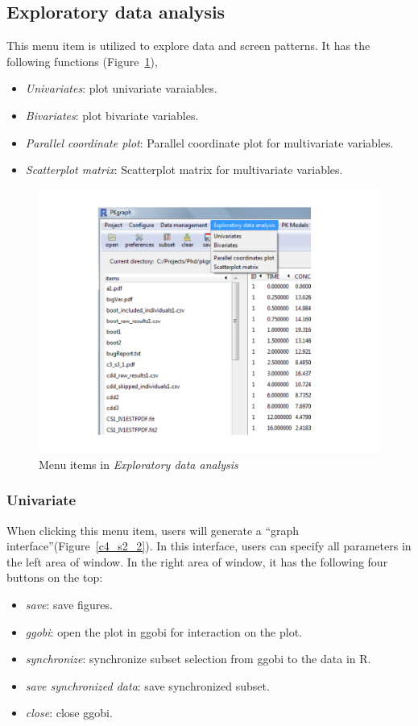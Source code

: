\documentclass[a4paper]{article}
\begin{document}
\subsection{Exploratory data analysis}
This menu item is utilized to explore data and screen patterns. It has the following functions (Figure~\ref{eda}),
\begin{itemize}
	\item \textit{Univariates}: plot univariate varaiables.
	\item \textit{Bivariates}: plot bivariate variables.
	\item \textit{Parallel coordinate plot}: Parallel coordinate plot for multivariate variables.
	\item \textit{Scatterplot matrix}: Scatterplot matrix for multivariate variables.
\end{itemize}
\begin{figure}[h!tb] \centering
\includegraphics[scale=0.6]{eda.pdf}
\caption{Menu items in \textit{Exploratory data analysis}}
\label{eda}
\end{figure}
\subsubsection{Univariate}
When clicking this menu item, users will generate a ``graph interface''(Figure~\ref{c4_s2_2}). In this interface, users can specify all parameters in the left area of window. In the right area of window, it has the following four buttons on the top:
\begin{itemize}
	\item \textit{save}: save figures.
	\item \textit{ggobi}: open the plot in ggobi for interaction on the plot.
	\item \textit{synchronize}: synchronize subset selection from ggobi to the data in R.
	\item \textit{save synchronized data}: save synchronized subset.
	\item \textit{close}: close ggobi.
\end{itemize}
\end{document}
